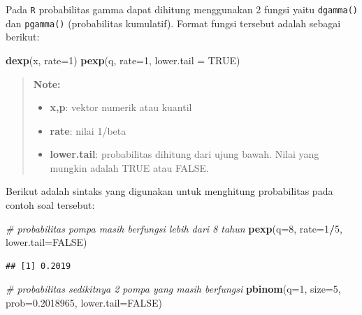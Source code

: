 \documentclass[]{book}
\newenvironment{Shaded}{\begin{snugshade}}{\end{snugshade}}
\newcommand{\KeywordTok}[1]{\textcolor[rgb]{0.13,0.29,0.53}{\textbf{#1}}}
\newcommand{\DataTypeTok}[1]{\textcolor[rgb]{0.13,0.29,0.53}{#1}}
\newcommand{\DecValTok}[1]{\textcolor[rgb]{0.00,0.00,0.81}{#1}}
\newcommand{\FloatTok}[1]{\textcolor[rgb]{0.00,0.00,0.81}{#1}}
\newcommand{\CommentTok}[1]{\textcolor[rgb]{0.56,0.35,0.01}{\textit{#1}}}
\newcommand{\OtherTok}[1]{\textcolor[rgb]{0.56,0.35,0.01}{#1}}
\newcommand{\OperatorTok}[1]{\textcolor[rgb]{0.81,0.36,0.00}{\textbf{#1}}}
\newcommand{\NormalTok}[1]{#1}
\providecommand{\tightlist}{%
  \setlength{\itemsep}{0pt}\setlength{\parskip}{0pt}}
\begin{document}
Pada \texttt{R} probabilitas gamma dapat dihitung menggunakan 2 fungsi
yaitu \texttt{dgamma()} dan \texttt{pgamma()} (probabilitas kumulatif).
Format fungsi tersebut adalah sebagai berikut:

\begin{Shaded}
\begin{Highlighting}[]
\KeywordTok{dexp}\NormalTok{(x, }\DataTypeTok{rate=}\DecValTok{1}\NormalTok{)}
\KeywordTok{pexp}\NormalTok{(q, }\DataTypeTok{rate=}\DecValTok{1}\NormalTok{, }\DataTypeTok{lower.tail =} \OtherTok{TRUE}\NormalTok{)}
\end{Highlighting}
\end{Shaded}

\begin{quote}
\textbf{Note: }

\begin{itemize}
\tightlist
\item
  \textbf{x,p}: vektor numerik atau kuantil
\item
  \textbf{rate}: nilai 1/beta
\item
  \textbf{lower.tail}: probabilitas dihitung dari ujung bawah. Nilai
  yang mungkin adalah TRUE atau FALSE.
\end{itemize}
\end{quote}

Berikut adalah sintaks yang digunakan untuk menghitung probabilitas pada
contoh soal tersebut:

\begin{Shaded}
\begin{Highlighting}[]
\CommentTok{# probabilitas pompa masih berfungsi lebih dari 8 tahun}
\KeywordTok{pexp}\NormalTok{(}\DataTypeTok{q=}\DecValTok{8}\NormalTok{, }\DataTypeTok{rate=}\DecValTok{1}\OperatorTok{/}\DecValTok{5}\NormalTok{, }\DataTypeTok{lower.tail=}\OtherTok{FALSE}\NormalTok{)}
\end{Highlighting}
\end{Shaded}

\begin{verbatim}
## [1] 0.2019
\end{verbatim}

\begin{Shaded}
\begin{Highlighting}[]
\CommentTok{# probabilitas sedikitnya 2 pompa yang masih berfungsi}
\KeywordTok{pbinom}\NormalTok{(}\DataTypeTok{q=}\DecValTok{1}\NormalTok{, }\DataTypeTok{size=}\DecValTok{5}\NormalTok{, }\DataTypeTok{prob=}\FloatTok{0.2018965}\NormalTok{, }\DataTypeTok{lower.tail=}\OtherTok{FALSE}\NormalTok{)}
\end{Highlighting}
\end{Shaded}
\end{document}
